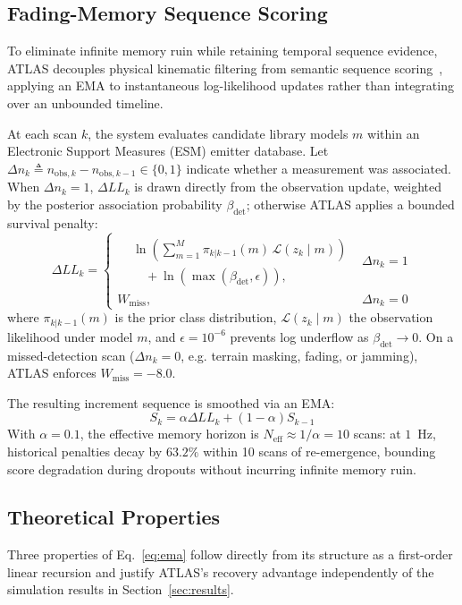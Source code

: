 \documentclass[conference]{IEEEtran}
\begin{document}
\subsection{Fading-Memory Sequence Scoring}
To eliminate infinite memory ruin while retaining temporal sequence evidence, ATLAS decouples physical kinematic filtering from semantic sequence scoring~\cite{musicki_2002_joint}, applying an EMA to instantaneous log-likelihood updates rather than integrating over an unbounded timeline.

At each scan $k$, the system evaluates candidate library models $m$ within an Electronic Support Measures (ESM) emitter database. Let $\Delta n_k \triangleq n_{\text{obs},k} - n_{\text{obs},k-1} \in \{0,1\}$ indicate whether a measurement was associated. When $\Delta n_k = 1$, $\Delta LL_k$ is drawn directly from the observation update, weighted by the posterior association probability $\beta_{\text{det}}$; otherwise ATLAS applies a bounded survival penalty:
\begin{equation}
\Delta LL_k = \begin{cases}
\begin{aligned}
&\ln\!\left(\sum_{m=1}^{M} \pi_{k|k-1}(m)\, \mathcal{L}(z_k \mid m)\right) \\
&\quad + \ln(\max(\beta_{\text{det}}, \epsilon)),
\end{aligned} & \Delta n_k = 1 \\[10pt]
W_{\text{miss}}, & \Delta n_k = 0
\end{cases}
\label{eq:llk}
\end{equation}
where $\pi_{k|k-1}(m)$ is the prior class distribution, $\mathcal{L}(z_k \mid m)$ the observation likelihood under model $m$, and $\epsilon = 10^{-6}$ prevents log underflow as $\beta_{\text{det}} \to 0$. On a missed-detection scan ($\Delta n_k = 0$, e.g. terrain masking, fading, or jamming), ATLAS enforces $W_{\text{miss}} = -8.0$.

The resulting increment sequence is smoothed via an EMA:
\begin{equation}
S_k = \alpha \Delta LL_k + (1-\alpha) S_{k-1}
\label{eq:ema}
\end{equation}
With $\alpha = 0.1$, the effective memory horizon is $N_{\text{eff}} \approx 1/\alpha = 10$ scans: at $1$~Hz, historical penalties decay by $63.2\%$ within 10 scans of re-emergence, bounding score degradation during dropouts without incurring infinite memory ruin.

\subsection{Theoretical Properties}
\label{sec:theory}
Three properties of Eq.~\eqref{eq:ema} follow directly from its structure as a first-order linear recursion and justify ATLAS's recovery advantage independently of the simulation results in Section~\ref{sec:results}.
\end{document}
